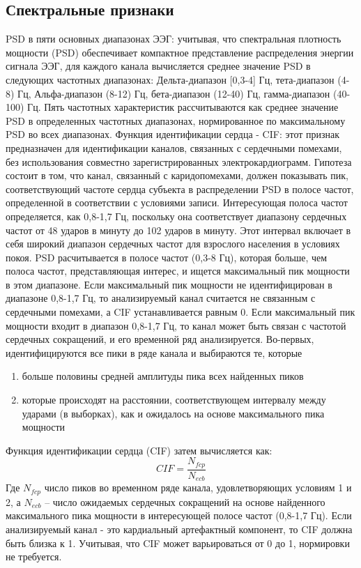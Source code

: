 \documentclass[12pt, a4paper, titlepage]{extreport}
\begin{document}
	\subsection*{Спектральные признаки}
	PSD в пяти основных диапазонах ЭЭГ: учитывая, что спектральная плотность мощности (PSD) обеспечивает компактное представление распределения энергии сигнала ЭЭГ, для каждого канала вычисляется среднее значение PSD в следующих частотных диапазонах: Дельта-диапазон [0,3-4] Гц, тета-диапазон (4-8) Гц, Альфа-диапазон (8-12) Гц, бета-диапазон (12-40) Гц, гамма-диапазон (40-100) Гц. Пять частотных характеристик рассчитываются как среднее значение PSD в определенных частотных диапазонах, нормированное по максимальному PSD во всех диапазонах.
	Функция идентификации сердца - CIF: этот признак предназначен для идентификации каналов, связанных с сердечными помехами, без использования совместно зарегистрированных электрокардиограмм. Гипотеза состоит в том, что канал, связанный с каридопомехами, должен показывать пик, соответствующий частоте сердца субъекта в распределении PSD в полосе частот, определенной в соответствии с условиями записи.  Интересующая полоса частот определяется, как 0,8-1,7 Гц, поскольку она соответствует диапазону сердечных частот от 48 ударов в минуту до 102 ударов в минуту. Этот интервал включает в себя широкий диапазон сердечных частот для взрослого населения в условиях покоя. PSD расчитывается в полосе частот (0,3-8 Гц), которая больше, чем полоса частот, представляющая интерес, и ищется максимальный пик мощности в этом диапазоне. Если максимальный пик мощности не идентифицирован в диапазоне 0,8-1,7 Гц, то анализируемый канал считается не связанным с сердечными помехами, а CIF устанавливается равным 0. Если максимальный пик мощности входит в диапазон 0,8-1,7 Гц, то канал может быть связан с частотой сердечных сокращений, и его временной ряд анализируется. Во-первых, идентифицируются все пики в ряде канала и выбираются те, которые 
	\begin{enumerate}
		\item больше половины средней амплитуды пика всех найденных пиков
		\item которые происходят на расстоянии, соответствующем интервалу между ударами (в выборках), как и ожидалось на основе максимального пика мощности
	\end{enumerate}
	Функция идентификации сердца (CIF) затем вычисляется как:
	$$
	CIF=\frac{N_{fcp}}{N_{ecb}}
	$$
	Где $N_{fcp}$ число пиков во временном ряде канала, удовлетворяющих условиям 1 и 2, а $N_{ecb}$ – число ожидаемых сердечных сокращений на основе найденного максимального пика мощности в интересующей полосе частот (0,8-1,7 Гц). Если анализируемый канал - это кардиальный артефактный компонент, то CIF должна быть близка к 1. Учитывая, что CIF может варьироваться от 0 до 1, нормировки не требуется.
	
\end{document}

